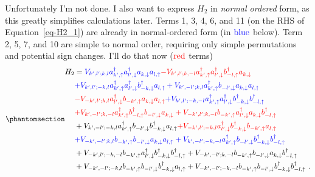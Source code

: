 \documentclass[
  letterpaper,
  DIV=11,
  numbers=noendperiod]{scrartcl}
\begin{document}
Unfortunately I'm not done. I also want to express \(H_2\) in
\emph{normal ordered} form, as this greatly simplifies calculations
later. Terms 1, 3, 4, 6, and 11 (on the RHS of Equation~\ref{eq-H2_1})
are already in normal-ordered form (in
\(\color{blue}\operatorname{blue}\) below). Term 2, 5, 7, and 10 are
simple to normal order, requiring only simple permutations and potential
sign changes. I'll do that now (\(\color{red}\operatorname{red}\) terms)
\begin{equation}\protect\phantomsection\label{eq-H2_2}{
\begin{align}
H_2&=\color{blue}{ V_{k',l';k,l}a^\dagger_{k',\uparrow}a^\dagger_{l',\downarrow}a^{}_{k,\downarrow}a^{}_{l,\uparrow}}\color{red}{-V_{k',l';k,-l}a^\dagger_{k',\uparrow}a^\dagger_{l',\downarrow}b^\dagger_{-l,\uparrow}a^{}_{k,\downarrow}}\\
&\color{blue}{+V_{k',l';-k,l}a^\dagger_{k',\uparrow}a^\dagger_{l',\downarrow}b^\dagger_{-k,\downarrow}a^{}_{l,\uparrow}+V_{k',-l';k,l}a^\dagger_{k',\uparrow}b^{}_{-l',\downarrow}a^{}_{k,\downarrow}a^{}_{l,\uparrow}}\\
&\color{red}{-V_{-k',l';k,l}a^\dagger_{l',\downarrow}b^{}_{-k',\uparrow}a^{}_{k,\downarrow}a^{}_{l,\uparrow}}\color{blue}{+V_{k',l';-k,-l}a^\dagger_{k',\uparrow}a^\dagger_{l',\downarrow}b^\dagger_{-k,\downarrow}b^\dagger_{-l,\uparrow}}\\
&\color{red}{+V_{k',-l';k,-l}a^\dagger_{k',\uparrow}b^\dagger_{-l,\uparrow}b^{}_{-l',\downarrow}a^{}_{k,\downarrow}}+V_{-k',l';k,-l}b^{}_{-k',\uparrow}a^\dagger_{l',\downarrow}a^{}_{k,\downarrow}b^\dagger_{-l,\uparrow}\\
%
&+V_{k',-l';-k,l}a^\dagger_{k',\uparrow}b^{}_{-l',\downarrow}b^\dagger_{-k,\downarrow}a^{}_{l,\uparrow}\color{red}{+V_{-k',l';-k,l}a^\dagger_{l',\downarrow}b^\dagger_{-k,\downarrow}b^{}_{-k',\uparrow}a^{}_{l,\uparrow}}\\
&\color{blue}{+V_{-k',-l';k,l}b^{}_{-k',\uparrow}b^{}_{-l',\downarrow}a^{}_{k,\downarrow}a^{}_{l,\uparrow}}+V_{k',-l';-k,-l}a^\dagger_{k',\uparrow}b^{}_{-l',\downarrow}b^\dagger_{-k,\downarrow}b^\dagger_{-l,\uparrow}\\
&+V_{-k',l';-k,-l}b^{}_{-k',\uparrow}a^\dagger_{l',\downarrow}b^\dagger_{-k,\downarrow}b^\dagger_{-l,\uparrow}+V_{-k',-l';k,-l}b^{}_{-k',\uparrow}b^{}_{-l',\downarrow}a^{}_{k,\downarrow}b^\dagger_{-l,\uparrow}\\
&+V_{-k',-l';-k,l}b^{}_{-k',\uparrow}b^{}_{-l',\downarrow}b^\dagger_{-k,\downarrow}a^{}_{l,\uparrow}+V_{-k',-l';-k,-l}b^{}_{-k',\uparrow}b^{}_{-l',\downarrow}b^\dagger_{-k,\downarrow}b^\dagger_{-l,\uparrow}\ .
\end{align}
}\end{equation}
\end{document}
